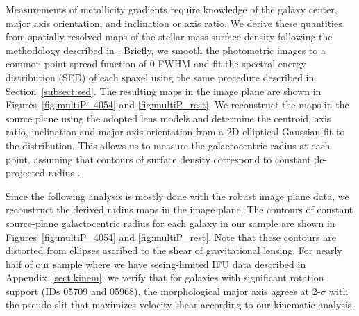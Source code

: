 Measurements of metallicity gradients require knowledge of the galaxy center, major axis orientation, and inclination or
axis ratio. We derive these quantities from spatially resolved maps of the stellar mass surface density following the
methodology described in \citet{2015AJ....149..107J}. Briefly, we smooth the \hff photometric
images to a common point spread function of 0 FWHM and fit the spectral energy
distribution (SED) of each spaxel using the same procedure described in
Section~\ref{subsect:sed}. The resulting \Mstar maps in the image plane are shown in Figures~\ref{fig:multiP_4054} and
\ref{fig:multiP_rest}. We reconstruct the \Mstar maps in the source plane using the adopted
lens models and determine the centroid, axis ratio, inclination and major axis orientation from a 2D
elliptical Gaussian fit to the \Mstar distribution. This allows us to measure the
galactocentric radius at each point, assuming that contours of \Mstar surface density
correspond to constant de-projected radius \citep[following][]{2015AJ....149..107J}. 

Since the following analysis is mostly done with the robust image plane data, we reconstruct
the derived radius maps in the image plane.
The contours of constant source-plane galactocentric radius for each galaxy in our sample are shown in 
Figures~\ref{fig:multiP_4054} and \ref{fig:multiP_rest}. Note that these contours are distorted from ellipses ascribed to the 
shear of gravitational lensing.
For nearly half of our sample where we have seeing-limited IFU data described in Appendix~\ref{sect:kinem}, we verify that for 
galaxies with significant rotation support (\eg IDs 05709 and 05968), the morphological major axis agrees at 2-$\sigma$ with
the pseudo-slit that maximizes velocity shear according to our kinematic analysis.

